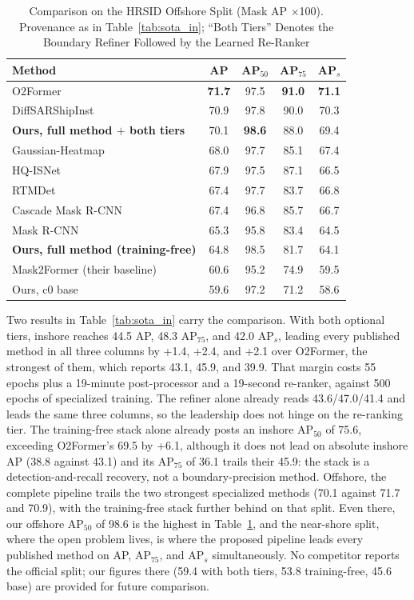 \begin{table}[!t]
\caption{Comparison on the HRSID Offshore Split (Mask AP $\times$100). Provenance as in Table~\ref{tab:sota_in}; ``Both Tiers'' Denotes the Boundary Refiner Followed by the Learned Re-Ranker}
\label{tab:sota_off}
\centering
\setlength{\tabcolsep}{4pt}
\begin{tabular}{lcccc}
\toprule
Method & AP & AP$_{50}$ & AP$_{75}$ & AP$_s$ \\
\midrule
O2Former & \textbf{71.7} & 97.5 & \textbf{91.0} & \textbf{71.1} \\
DiffSARShipInst & 70.9 & 97.8 & 90.0 & 70.3 \\
\textbf{Ours, full method $+$ both tiers} & 70.1 & \textbf{98.6} & 88.0 & 69.4 \\
Gaussian-Heatmap & 68.0 & 97.7 & 85.1 & 67.4 \\
HQ-ISNet & 67.9 & 97.5 & 87.1 & 66.5 \\
RTMDet & 67.4 & 97.7 & 83.7 & 66.8 \\
Cascade Mask R-CNN & 67.4 & 96.8 & 85.7 & 66.7 \\
Mask R-CNN & 65.3 & 95.8 & 83.4 & 64.5 \\
\textbf{Ours, full method (training-free)} & 64.8 & 98.5 & 81.7 & 64.1 \\
Mask2Former (their baseline) & 60.6 & 95.2 & 74.9 & 59.5 \\
Ours, c0 base & 59.6 & 97.2 & 71.2 & 58.6 \\
\bottomrule
\end{tabular}
\end{table}

Two results in Table~\ref{tab:sota_in} carry the comparison. With both optional tiers, inshore reaches 44.5 AP, 48.3 AP$_{75}$, and 42.0 AP$_s$, leading every published method in all three columns by +1.4, +2.4, and +2.1 over O2Former, the strongest of them, which reports 43.1, 45.9, and 39.9. That margin costs 55 epochs plus a 19-minute post-processor and a 19-second re-ranker, against 500 epochs of specialized training. The refiner alone already reads 43.6/47.0/41.4 and leads the same three columns, so the leadership does not hinge on the re-ranking tier. The training-free stack alone already posts an inshore AP$_{50}$ of 75.6, exceeding O2Former's 69.5 by +6.1, although it does not lead on absolute inshore AP (38.8 against 43.1) and its AP$_{75}$ of 36.1 trails their 45.9: the stack is a detection-and-recall recovery, not a boundary-precision method. Offshore, the complete pipeline trails the two strongest specialized methods (70.1 against 71.7 and 70.9), with the training-free stack further behind on that split. Even there, our offshore AP$_{50}$ of 98.6 is the highest in Table~\ref{tab:sota_off}, and the near-shore split, where the open problem lives, is where the proposed pipeline leads every published method on AP, AP$_{75}$, and AP$_s$ simultaneously. No competitor reports the official split; our figures there (59.4 with both tiers, 53.8 training-free, 45.6 base) are provided for future comparison.

